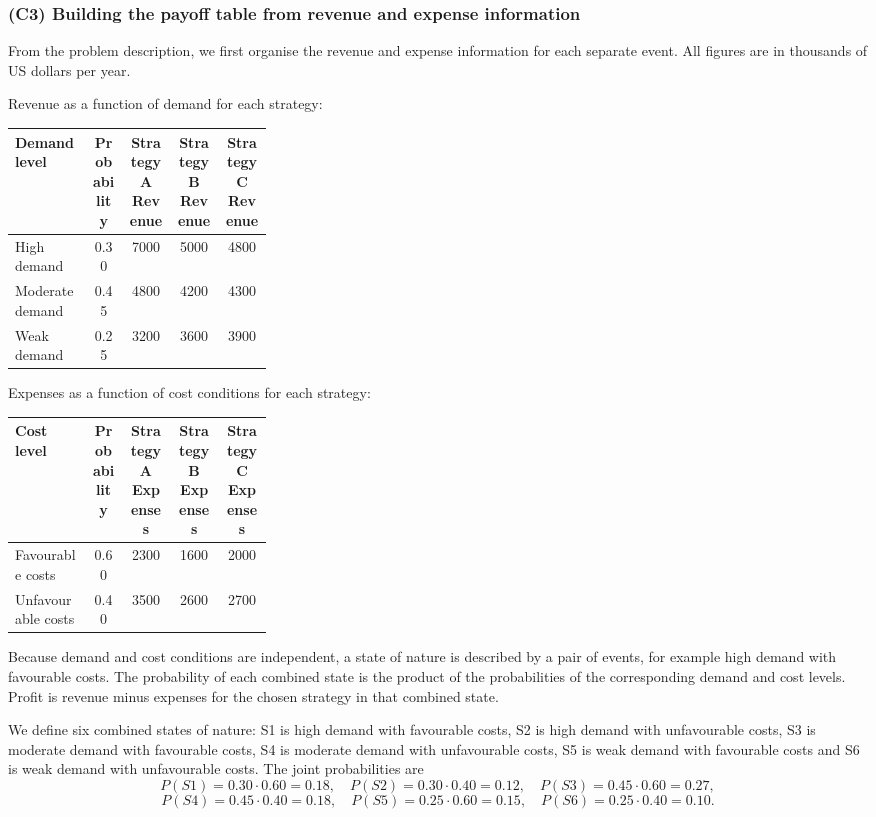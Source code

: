 	\subsubsection{(C3) Building the payoff table from revenue and expense information}\label{subsubsec:example2-c3}
	
	From the problem description, we first organise the revenue and expense information for each separate event. All figures are in thousands of US dollars per year.
	
	\medskip
	\noindent Revenue as a function of demand for each strategy:
	\begin{table}[h!]
		\centering
		\begin{tabularx}{\linewidth}{@{}L{0.3\linewidth}C C C C@{}}
			\toprule
			Demand level & Probability & Strategy A Revenue & Strategy B Revenue & Strategy C Revenue \\
			\midrule
			High demand     & 0.30 & 7000 & 5000 & 4800 \\
			Moderate demand & 0.45 & 4800 & 4200 & 4300 \\
			Weak demand     & 0.25 & 3200 & 3600 & 3900 \\
			\bottomrule
		\end{tabularx}
	\end{table}
	
	\medskip
	\noindent Expenses as a function of cost conditions for each strategy:
	\begin{table}[h!]
		\centering
		\begin{tabularx}{\linewidth}{@{}L{0.3\linewidth}C C C C@{}}
			\toprule
			Cost level & Probability & Strategy A Expenses & Strategy B Expenses & Strategy C Expenses \\
			\midrule
			Favourable costs   & 0.60 & 2300 & 1600 & 2000 \\
			Unfavourable costs & 0.40 & 3500 & 2600 & 2700 \\
			\bottomrule
		\end{tabularx}
	\end{table}
	
	Because demand and cost conditions are independent, a state of nature is described by a pair of events, for example high demand with favourable costs. The probability of each combined state is the product of the probabilities of the corresponding demand and cost levels. Profit is revenue minus expenses for the chosen strategy in that combined state.
	
	\medskip
	We define six combined states of nature: S1 is high demand with favourable costs, S2 is high demand with unfavourable costs, S3 is moderate demand with favourable costs, S4 is moderate demand with unfavourable costs, S5 is weak demand with favourable costs and S6 is weak demand with unfavourable costs. The joint probabilities are
	\[
	P(S1)=0.30\cdot 0.60=0.18,\quad
	P(S2)=0.30\cdot 0.40=0.12,\quad
	P(S3)=0.45\cdot 0.60=0.27,
	\]
	\[
	P(S4)=0.45\cdot 0.40=0.18,\quad
	P(S5)=0.25\cdot 0.60=0.15,\quad
	P(S6)=0.25\cdot 0.40=0.10.
	\]
	
